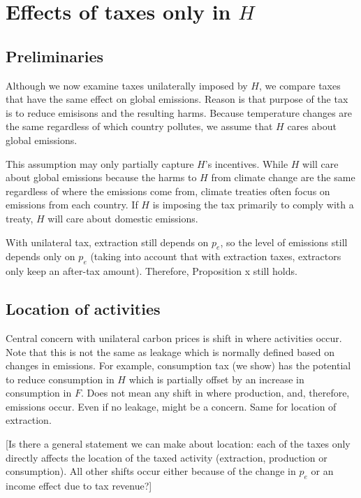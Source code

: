 \documentclass[notitlepage,12pt]{article}
\begin{document}
\section{Effects of taxes only in $H$}

\subsection{Preliminaries}

Although we now examine taxes unilaterally imposed by $H$, we compare taxes
that have the same effect on global emissions. Reason is that purpose of the
tax is to reduce emisisons and the resulting harms. Because temperature
changes are the same regardless of which country pollutes, we assume that $H$
cares about global emissions.

This assumption may only partially capture $H$'s incentives. While $H$ will
care about global emissions because the harms to $H$ from climate change are
the same regardless of where the emissions come from, climate treaties often
focus on emissions from each country. If $H$ is imposing the tax primarily
to comply with a treaty, $H$ will care about domestic emissions.

With unilateral tax, extraction still depends on $p_{e}$, so the level of
emissions still depends only on $p_{e}$ (taking into account that with
extraction taxes, extractors only keep an after-tax amount). Therefore,
Proposition x still holds.

\subsection{Location of activities}

Central concern with unilateral carbon prices is shift in where activities
occur. Note that this is not the same as leakage which is normally defined
based on changes in emissions. For example, consumption tax (we show) has
the potential to reduce consumption in $H$ which is partially offset by an
increase in consumption in $F$. Does not mean any shift in where production,
and, therefore, emissions occur. Even if no leakage, might be a concern.
Same for location of extraction.

[Is there a general statement we can make about location: each of the taxes
only directly affects the location of the taxed activity (extraction,
production or consumption). All other shifts occur either because of the
change in $p_{e}$ or an income effect due to tax revenue?]
\end{document}
